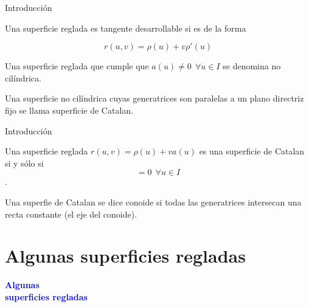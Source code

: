 \documentclass[10pt]{beamer}
\begin{document}
	\begin{frame}{Introducción}
			\begin{defi}
				Una superficie reglada es tangente desarrollable si es de la forma 
				
				\begin{equation}
				r(u,v) = \rho(u) + v \rho'(u)
				\end{equation}
			\end{defi}
			
			\begin{defi}
				Una superficie reglada que cumple que $a(u) \neq 0 \ \ \forall u \in I$ se denomina no cilíndrica. 
			\end{defi}
			
			\begin{defi}
				Una superficie no cilíndrica cuyas generatrices son paralelas a un plano directriz fijo se llama superficie de Catalan.
			\end{defi}
			
	\end{frame}
	
	\begin{frame}{Introducción}
		\begin{teo}
			Una superficie reglada $r(u,v) = \rho(u) + v a(u)$ es una superficie de Catalan si y sólo si
			\begin{equation}
			[a(u), a'(a), a''(u)] = 0  \ \ \forall u \in I
			\end{equation}.
		\end{teo}
		
		\begin{defi}
			Una superfie de Catalan se dice conoide si todas las generatrices intersecan una recta constante (el eje del conoide).
		\end{defi}
		
	
	\end{frame}
	
	\section{Algunas superficies regladas}
	
	\begin{frame}
		\begin{center}
			\Huge\textbf{\textsf{\textcolor{blue}{Algunas \\ superficies regladas}}}
		\end{center}
	\end{frame}
	
\end{document}
